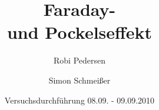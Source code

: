 \documentclass[a4paper,oneside]{scrartcl} %
\title{Faraday- \\ und Pockelseffekt}
\author{Robi Pedersen \and Simon Schmeißer}
\date{Versuchsdurchführung 08.09. - 09.09.2010}
\begin{document}
\begin{titlepage}
  \maketitle
  \vfill
  \thispagestyle{empty}
\end{titlepage}

\tableofcontents
\clearpage








\clearpage

% 
%
\end{document}
